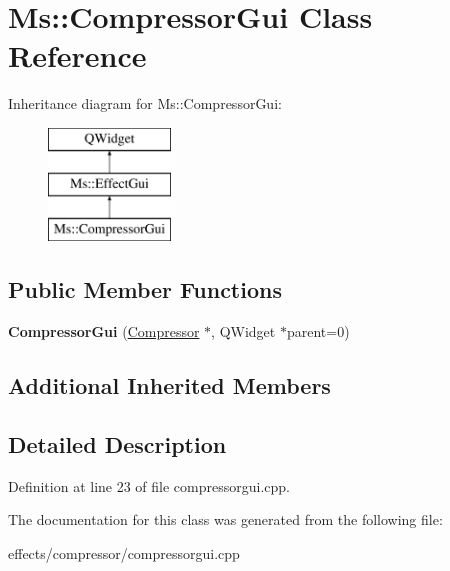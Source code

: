 \hypertarget{class_ms_1_1_compressor_gui}{}\section{Ms\+:\+:Compressor\+Gui Class Reference}
\label{class_ms_1_1_compressor_gui}
Inheritance diagram for Ms\+:\+:Compressor\+Gui\+:\begin{figure}[H]
\begin{center}
\leavevmode
\includegraphics[height=3.000000cm]{class_ms_1_1_compressor_gui}
\end{center}
\end{figure}
\subsection*{Public Member Functions}
\begin{DoxyCompactItemize}
\item 
\mbox{\label{class_ms_1_1_compressor_gui_adf88ce134acb1508195e96767f972540}} 
{\bfseries Compressor\+Gui} (\hyperlink{class_ms_1_1_compressor}{Compressor} $\ast$, Q\+Widget $\ast$parent=0)
\end{DoxyCompactItemize}
\subsection*{Additional Inherited Members}


\subsection{Detailed Description}


Definition at line 23 of file compressorgui.\+cpp.



The documentation for this class was generated from the following file\+:\begin{DoxyCompactItemize}
\item 
effects/compressor/compressorgui.\+cpp\end{DoxyCompactItemize}
